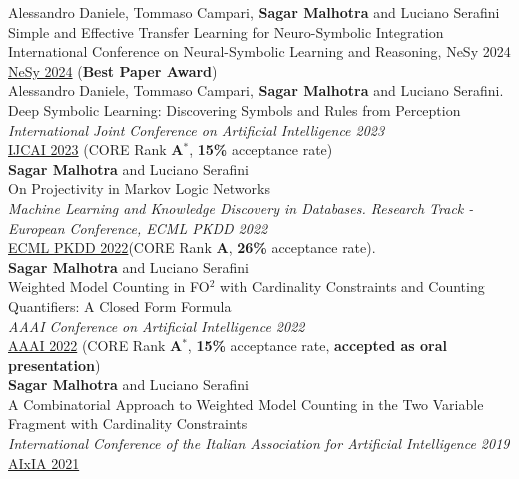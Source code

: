 \documentclass[10pt, a4paper]{article}
\newcommand{\years}[1]{\marginnote{\scriptsize #1}}
\begin{document}
\years{2024}Alessandro Daniele, Tommaso Campari, \textbf{Sagar Malhotra} and Luciano Serafini\\
Simple and Effective Transfer Learning for Neuro-Symbolic Integration\\
International Conference on Neural-Symbolic Learning and Reasoning, NeSy 2024\\
\href{https://arxiv.org/abs/2402.14047}{NeSy 2024} (\textbf{Best Paper Award})\\ 

\years{2023}Alessandro Daniele, Tommaso Campari, \textbf{Sagar Malhotra} and Luciano Serafini. \\ Deep Symbolic Learning: Discovering Symbols and Rules from Perception \\ 
\emph{International Joint Conference on Artificial Intelligence 2023}\\
\href{https://www.ijcai.org/proceedings/2023/400}{IJCAI 2023} (CORE Rank \textbf{A$^{*}$}, \textbf{15\%} acceptance rate)\\ 


\years{2022}\textbf{Sagar Malhotra} and Luciano Serafini\\
 On Projectivity in Markov Logic Networks \\ \emph{Machine Learning and Knowledge Discovery in Databases. Research Track - European Conference, ECML PKDD 2022} \\  
\href{https://link.springer.com/chapter/10.1007/978-3-031-26419-1_14}{ECML PKDD 2022}(CORE Rank \textbf{A}, \textbf{26\%} acceptance rate).\\ 

\years{2022}\textbf{Sagar Malhotra} and Luciano Serafini\\ 
Weighted Model Counting in FO$^2$ with Cardinality Constraints and Counting Quantifiers: A Closed Form Formula \\ \emph{AAAI Conference on Artificial Intelligence 2022}\\
\href{https://ojs.aaai.org/index.php/AAAI/article/view/20525}{AAAI 2022} (CORE Rank \textbf{A$^{*}$}, \textbf{15\%} acceptance rate, \textbf{accepted as oral presentation}) \\

\years{2021}\textbf{Sagar Malhotra} and Luciano Serafini\\
 A Combinatorial Approach to Weighted Model Counting in the Two Variable Fragment with Cardinality Constraints\\ \emph{International Conference of the Italian Association for Artificial Intelligence 2019}\\
\href{https://link.springer.com/chapter/10.1007/978-3-031-08421-8_10}{AIxIA 2021}
\end{document}
